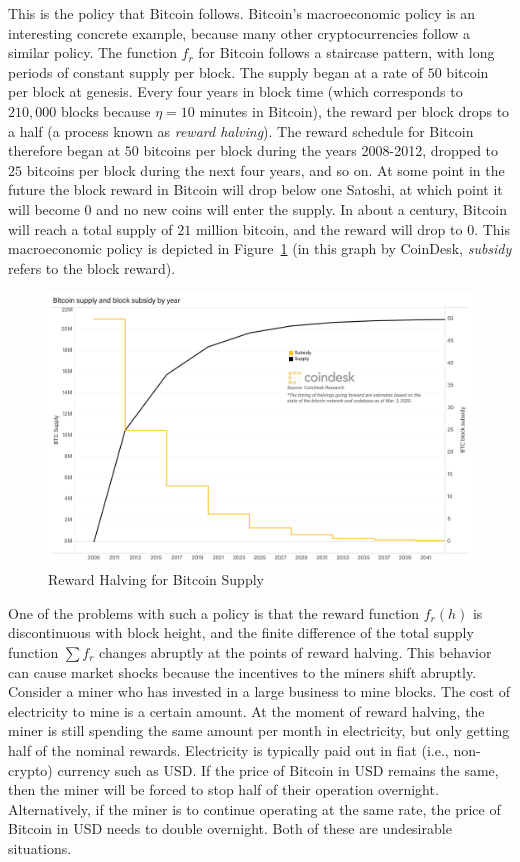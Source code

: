 This is the policy that Bitcoin follows.
Bitcoin's macroeconomic policy is an interesting concrete example, because
many other cryptocurrencies follow a similar policy. The function $f_r$
for Bitcoin follows a staircase pattern, with long periods of constant
supply per block. The supply began at a rate of $50$ bitcoin per block
at genesis. Every four years in block time (which corresponds to
$210{,}000$ blocks because $\eta = 10$ minutes in Bitcoin), the reward
per block drops to a half (a process known as \emph{reward halving}).
The reward schedule for Bitcoin therefore
began at $50$ bitcoins per block during the years 2008-2012, dropped
to $25$ bitcoins per block during the next four years, and so on. At
some point in the future the block reward in Bitcoin will drop below
one Satoshi, at which point it will become $0$ and no new coins will
enter the supply. In about a century, Bitcoin will reach a total supply
of $21$ million bitcoin, and the reward will drop to $0$. This
macroeconomic policy is depicted in Figure~\ref{fig:reward_halving}
(in this graph by CoinDesk, \emph{subsidy} refers to the block
reward).

\begin{figure}[ht]
    \centering
    \includegraphics[scale = 0.2]{figures/reward_halving.png}
    \caption{Reward Halving for Bitcoin Supply\cite{halving}}
    \label{fig:reward_halving}
\end{figure}

One of the problems with such a policy is that the reward function
$f_r(h)$ is discontinuous with block height, and the finite difference
of the total supply function $\sum f_r$ changes abruptly at the points of
reward halving. This behavior can cause market shocks because the incentives
to the miners shift abruptly. Consider a miner who has invested in a large
business to mine blocks. The cost of electricity to mine is a certain
amount. At the moment of reward halving, the miner is still spending
the same amount per month in electricity, but only getting half of the
nominal rewards. Electricity is typically paid out in fiat (i.e., non-crypto)
currency such as USD. If the price of Bitcoin in USD remains the same, then
the miner will be forced to stop half of their operation overnight.
Alternatively, if the miner is to continue operating at the same rate,
the price of Bitcoin in USD needs to double overnight. Both of these
are undesirable situations.

